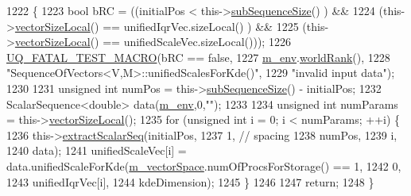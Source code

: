\begin{DoxyCode}
1222 \{
1223   \textcolor{keywordtype}{bool} bRC = ((initialPos              <  this->\hyperlink{class_q_u_e_s_o_1_1_sequence_of_vectors_a0224bd3e961d86af5d2886301c0c2b86}{subSequenceSize}()    ) &&
1224               (this->\hyperlink{class_q_u_e_s_o_1_1_base_vector_sequence_a2fefedf9e5b90f22881103b3f92555f6}{vectorSizeLocal}() == unifiedIqrVec.sizeLocal()  ) &&
1225               (this->\hyperlink{class_q_u_e_s_o_1_1_base_vector_sequence_a2fefedf9e5b90f22881103b3f92555f6}{vectorSizeLocal}() == unifiedScaleVec.sizeLocal()));
1226   \hyperlink{_defines_8h_a56d63d18d0a6d45757de47fcc06f574d}{UQ\_FATAL\_TEST\_MACRO}(bRC == \textcolor{keyword}{false},
1227                       \hyperlink{class_q_u_e_s_o_1_1_base_vector_sequence_a8e8824d2a63c5a43bcc6473e3a0491e8}{m\_env}.\hyperlink{class_q_u_e_s_o_1_1_base_environment_a78b57112bbd0e6dd0e8afec00b40ffa7}{worldRank}(),
1228                       \textcolor{stringliteral}{"SequenceOfVectors<V,M>::unifiedScalesForKde()"},
1229                       \textcolor{stringliteral}{"invalid input data"});
1230 
1231   \textcolor{keywordtype}{unsigned} \textcolor{keywordtype}{int} numPos = this->\hyperlink{class_q_u_e_s_o_1_1_sequence_of_vectors_a0224bd3e961d86af5d2886301c0c2b86}{subSequenceSize}() - initialPos;
1232   ScalarSequence<double> data(\hyperlink{class_q_u_e_s_o_1_1_base_vector_sequence_a8e8824d2a63c5a43bcc6473e3a0491e8}{m\_env},0,\textcolor{stringliteral}{""});
1233 
1234   \textcolor{keywordtype}{unsigned} \textcolor{keywordtype}{int} numParams = this->\hyperlink{class_q_u_e_s_o_1_1_base_vector_sequence_a2fefedf9e5b90f22881103b3f92555f6}{vectorSizeLocal}();
1235   \textcolor{keywordflow}{for} (\textcolor{keywordtype}{unsigned} \textcolor{keywordtype}{int} i = 0; i < numParams; ++i) \{
1236     this->\hyperlink{class_q_u_e_s_o_1_1_sequence_of_vectors_ac977b3b26a6af2ae727671f1246262fd}{extractScalarSeq}(initialPos,
1237                            1, \textcolor{comment}{// spacing}
1238                            numPos,
1239                            i,
1240                            data);
1241     unifiedScaleVec[i] = data.unifiedScaleForKde(\hyperlink{class_q_u_e_s_o_1_1_base_vector_sequence_a4bd171e39ed050ff105c808336f35198}{m\_vectorSpace}.numOfProcsForStorage() == 1,
1242                                                  0,
1243                                                  unifiedIqrVec[i],
1244                                                  kdeDimension);
1245   \}
1246 
1247   \textcolor{keywordflow}{return};
1248 \}
\end{DoxyCode}
